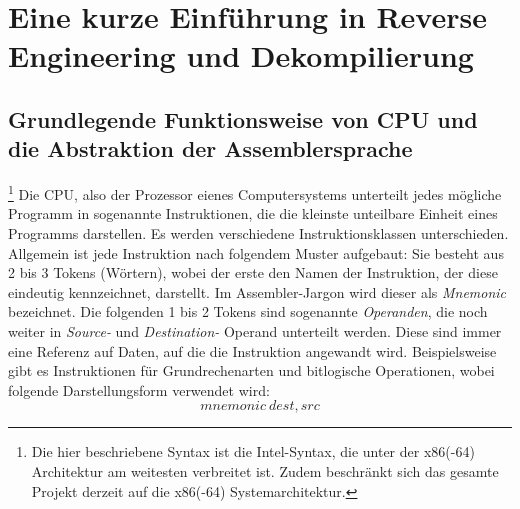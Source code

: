 \documentclass[11pt]{article}
\begin{document}
\section{Eine kurze Einführung in Reverse Engineering und Dekompilierung}
\subsection{Grundlegende Funktionsweise von CPU und die Abstraktion der Assemblersprache}\footnote{
		Die hier beschriebene Syntax ist die Intel-Syntax, die unter der x86(-64)
		Architektur am weitesten verbreitet ist. Zudem beschränkt sich das gesamte Projekt derzeit
        auf die x86(-64) Systemarchitektur.}
Die CPU, also der Prozessor eienes Computersystems unterteilt jedes mögliche Programm in sogenannte
Instruktionen, die die kleinste unteilbare Einheit eines Programms darstellen. Es werden
verschiedene Instruktionsklassen unterschieden. Allgemein ist jede Instruktion nach folgendem Muster
aufgebaut: Sie besteht aus 2 bis 3 Tokens (Wörtern), wobei der erste den Namen der Instruktion, der
diese eindeutig kennzeichnet, darstellt. Im Assembler-Jargon wird dieser als \textit{Mnemonic}
bezeichnet. Die folgenden 1 bis 2 Tokens sind sogenannte \textit{Operanden}, die noch weiter in
\textit{Source-} und \textit{Destination-} Operand unterteilt werden. Diese sind immer
eine Referenz auf Daten, auf die die Instruktion angewandt wird. Beispielsweise gibt es
Instruktionen für Grundrechenarten und bitlogische Operationen, wobei folgende Darstellungsform
verwendet wird: $$ mnemonic\ dest, src$$
\end{document}
